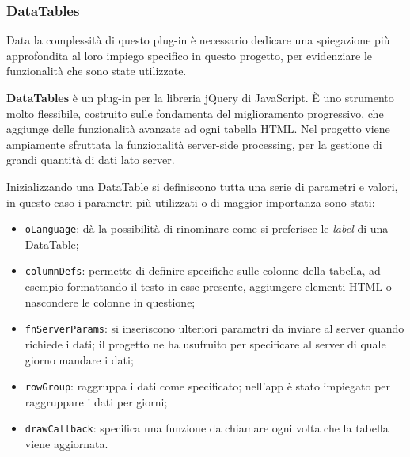 \subsubsection{DataTables} \label{datatables}

Data la complessità di questo plug-in è necessario dedicare una spiegazione più approfondita al loro impiego specifico in questo progetto, per evidenziare le funzionalità che sono state utilizzate.

\textbf{DataTables} \cite{DataTables} è un plug-in per la libreria jQuery di JavaScript. È uno strumento molto flessibile, costruito sulle fondamenta del miglioramento progressivo, che aggiunge delle funzionalità avanzate ad ogni tabella HTML.
Nel progetto viene ampiamente sfruttata la funzionalità server-side processing, per la gestione di grandi quantità di dati lato server.

Inizializzando una DataTable si definiscono tutta una serie di parametri e valori, in questo caso i parametri più utilizzati o di maggior importanza sono stati:
\begin{itemize}
    \item \texttt{oLanguage}: dà la possibilità di rinominare come si preferisce le \emph{label} di una DataTable;
    \item \texttt{columnDefs}: permette di definire specifiche sulle colonne della tabella, ad esempio formattando il testo in esse presente, aggiungere elementi HTML o nascondere le colonne in questione;
    \item \texttt{fnServerParams}: si inseriscono ulteriori parametri da inviare al server quando richiede i dati; il progetto ne ha usufruito per specificare al server di quale giorno mandare i dati;
    \item \texttt{rowGroup}: raggruppa i dati come specificato; nell'app è stato impiegato per raggruppare i dati per giorni;
    \item \texttt{drawCallback}: specifica una funzione da chiamare ogni volta che la tabella viene aggiornata.
\end{itemize}


